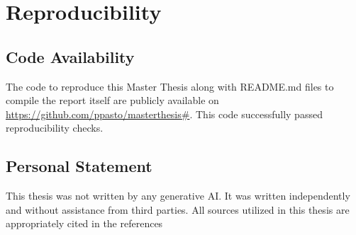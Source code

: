 





\chapter{Reproducibility} \label{appndx}
% 
% 
%  
% 
% 
\section{Code Availability}

The code to reproduce this Master Thesis along with README.md files to compile the report itself are publicly available on \url{https://github.com/ppasto/masterthesis#}. This code successfully passed reproducibility checks.



\section{Personal Statement}

This thesis was not written by any generative AI. It was written independently and
without assistance from third parties. All sources utilized in this thesis are appropriately cited in the references

